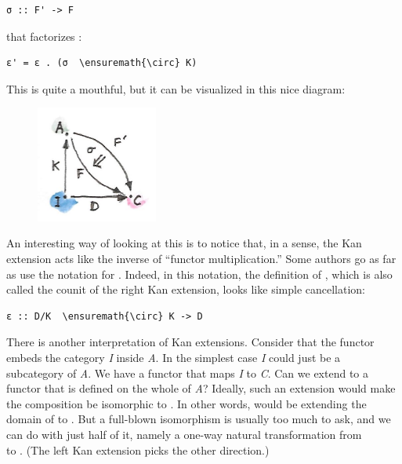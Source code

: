 \begin{Verbatim}[commandchars=\\\{\}]
σ :: F' -> F
\end{Verbatim}
that factorizes :

\begin{Verbatim}[commandchars=\\\{\}]
ε' = ε . (σ  \ensuremath{\circ} K)
\end{Verbatim}
This is quite a mouthful, but it can be visualized in this nice diagram:

\begin{figure}[H]
\centering
\includegraphics[width=40mm]{images/kan7.jpg}
\end{figure}

\noindent
An interesting way of looking at this is to notice that, in a sense, the
Kan extension acts like the inverse of ``functor multiplication.'' Some
authors go as far as use the notation  for .
Indeed, in this notation, the definition of , which is also
called the counit of the right Kan extension, looks like simple
cancellation:

\begin{Verbatim}[commandchars=\\\{\}]
ε :: D/K  \ensuremath{\circ} K -> D
\end{Verbatim}
There is another interpretation of Kan extensions. Consider that the
functor  embeds the category \emph{I} inside \emph{A}. In the
simplest case \emph{I} could just be a subcategory of \emph{A}. We have
a functor  that maps \emph{I} to \emph{C}. Can we extend
 to a functor  that is defined on the whole of
\emph{A}? Ideally, such an extension would make the composition
 be isomorphic to . In other words, 
would be extending the domain of  to . But a
full-blown isomorphism is usually too much to ask, and we can do with
just half of it, namely a one-way natural transformation  from\\
 to . (The left Kan extension picks the other
direction.)


